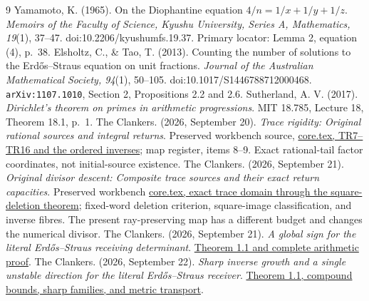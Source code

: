 \begin{thebibliography}{9}
 Yamamoto, K. (1965). On the Diophantine equation
$4/n=1/x+1/y+1/z$. \emph{Memoirs of the Faculty of Science, Kyushu University,
Series A, Mathematics, 19}(1), 37--47. doi:10.2206/kyushumfs.19.37.
Primary locator: Lemma 2, equation (4), p.~38.
 Elsholtz, C., \& Tao, T. (2013). Counting the number of solutions
to the Erd\H{o}s--Straus equation on unit fractions.
\emph{Journal of the Australian Mathematical Society, 94}(1), 50--105.
doi:10.1017/S1446788712000468. \texttt{arXiv:1107.1010}, Section 2,
Propositions 2.2 and 2.6.
 Sutherland, A. V. (2017). \emph{Dirichlet's theorem on primes
in arithmetic progressions}. MIT 18.785, Lecture 18, Theorem 18.1, p.~1.
 The Clankers. (2026, September 20). \emph{Trace rigidity:
Original rational sources and integral returns}. Preserved workbench source,
\href{https://github.com/KokunoYumeto/erdos-straus-foundation/blob/799c53ffbad2dd9826ed8cb59ac9fe04958a3ce1/research/incoming/es-turn07-trace-rigidity-20260920/core.tex\#L160-L224}
{core.tex, TR7--TR16 and the ordered inverses}; map register, items 8--9.
Exact rational-tail factor coordinates, not initial-source existence.
 The Clankers. (2026, September 21). \emph{Original divisor descent:
Composite trace sources and their exact return capacities}. Preserved workbench
\href{https://github.com/KokunoYumeto/erdos-straus-foundation/blob/799c53ffbad2dd9826ed8cb59ac9fe04958a3ce1/research/incoming/es-turn07-divisor-descent-20260921/core.tex\#L22-L313}
{core.tex, exact trace domain through the square-deletion theorem}; fixed-word deletion
criterion, square-image classification, and inverse fibres. The present
ray-preserving map has a different budget and changes the numerical divisor.
 The Clankers. (2026, September 21). \emph{A global sign
for the literal Erd\H{o}s--Straus receiving determinant}.
\href{https://github.com/KokunoYumeto/erdos-straus-foundation/blob/799c53ffbad2dd9826ed8cb59ac9fe04958a3ce1/research/incoming/es-turn07-global-receiver-determinant-20260921/core.tex\#L1-L488}
{Theorem 1.1 and complete arithmetic proof}.
 The Clankers. (2026, September 22). \emph{Sharp inverse
growth and a single unstable direction for the literal Erd\H{o}s--Straus
receiver}.
\href{https://github.com/KokunoYumeto/erdos-straus-foundation/blob/e713c342fc16e361e104de3322790ca0cee7281d/research/incoming/es-turn07-sharp-receiver-growth-20260921/core.tex\#L75-L636}
{Theorem 1.1, compound bounds, sharp families, and metric transport}.
\end{thebibliography}
